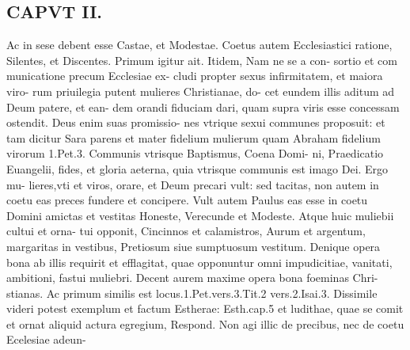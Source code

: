 \documentclass{article}
\begin{document}
\begin{pages}
\section*{CAPVT  II. }
\marginpar{[ p.77 ]}\pstart Ac in sese debent esse Castae, et Modestae. Coetus autem Ecclesiastici ratione, Silentes, et Discentes. Primum igitur ait. Itidem, Nam ne se a con- sortio et com municatione precum Ecclesiae ex- cludi propter sexus infirmitatem, et maiora viro- rum priuilegia putent mulieres Christianae, do- cet eundem illis aditum ad Deum patere, et ean- dem orandi fiduciam dari, quam supra viris esse concessam ostendit. Deus enim suas promissio- nes vtrique sexui communes proposuit: et tam dicitur Sara parens et mater fidelium mulierum quam Abraham fidelium virorum 1.Pet.3. Communis vtrisque Baptismus, Coena Domi- ni, Praedicatio Euangelii, fides, et gloria aeterna, quia vtrisque communis est imago Dei. Ergo mu- lieres,vti et viros, orare, et Deum precari vult: sed tacitas, non autem in coetu eas preces fundere et concipere. Vult autem Paulus eas esse in coetu Domini amictas et vestitas Honeste, Verecunde et Modeste. Atque huic muliebii cultui et orna- tui opponit, Cincinnos et calamistros, Aurum et argentum, margaritas in vestibus, Pretiosum siue sumptuosum vestitum. Denique opera bona ab illis requirit et efflagitat, quae opponuntur omni impudicitiae, vanitati, ambitioni, fastui muliebri. Decent aurem maxime opera bona foeminas Chri- stianas. Ac primum similis est locus.1.Pet.vers.3.Tit.2 vers.2.Isai.3. Dissimile videri potest exemplum et factum Estherae: Esth.cap.5 et ludithae, quae se comit et ornat aliquid actura egregium, Respond. Non agi illic de precibus, nec de coetu Ecelesiae adeun-  \pend

\end{pages}
\end{document}
